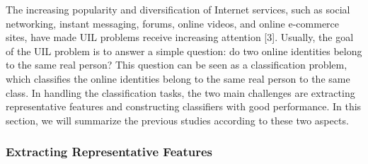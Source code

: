 \documentclass[journal]{IEEEtran}
\begin{document}
The increasing popularity and diversification of Internet services, such as social networking, instant messaging, forums, online videos, and online e-commerce sites, have made UIL problems receive increasing attention [3]. Usually, the goal of the UIL problem is to answer a simple question: do two online identities belong to the same real person? This question can be seen as a classification problem, which classifies the online identities belong to the same real person to the same class. In handling the classification tasks, the two main challenges are extracting representative features and constructing classifiers with good performance. In this section, we will summarize the previous studies according to these two aspects.

\subsubsection{Extracting Representative Features}
\end{document}
